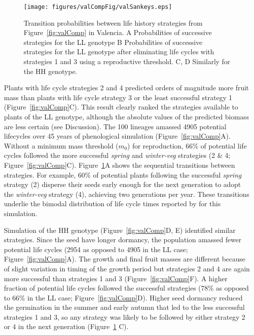 \begin{figure}[tb]
\texttt{[image: figures/valCompFig/valSankeys.eps]}
\caption{Transition probabilities between life history strategies from
  Figure~\ref{fig:valComp} in Valencia. A Probabilities of successive strategies
  for the LL genotype B Probabilities of successive strategies for the LL
  genotype after eliminating life cycles with strategies 1 and 3 using a
  reproductive threshold. C, D Similarly for the HH genotype.}
\label{fig:valSank}
\end{figure}

Plants with life cycle strategies 2 and 4 predicted orders of magnitude more
fruit mass than plants with life cycle strategy 3 or the least successful
strategy 1 (Figure~\ref{fig:valComp}C). This result clearly ranked the
strategies available to plants of the LL genotype, although the absolute values
of the predicted biomass are less certain (see Discussion). The 100 lineages
amassed 4905 potential lifecycles over 45 years of phenological simulation
(Figure~\ref{fig:valComp}A). Without a minimum mass threshold ($m_0$) for
reproduction, 66\% of potential life cycles followed the more successful
\emph{spring} and \emph{winter-veg} strategies (2 \& 4;
Figure~\ref{fig:valComp}C). Figure~\ref{fig:valSank}A shows the sequential
transitions between strategies. For example, 60\% of potential plants following
the successful \emph{spring} strategy (2) disperse their seeds early enough for
the next generation to adopt the \emph{winter-veg} strategy (4), achieving two
generations per year. These transitions underlie the bimodal distribution of
life cycle times reported by \citet{burghardt_modeling_2015} for this
simulation.

Simulation of the HH genotype (Figure~\ref{fig:valComp}D, E) identified similar
strategies. Since the seed have longer dormancy, the population amassed
fewer potential life cycles (2954 as opposed to 4905 in the LL case;
Figure~\ref{fig:valComp}A). The growth and final fruit masses are different because of
slight variation in timing of the growth period but strategies 2 and 4
are again more successful than strategies 1 and 3 (Figure~\ref{fig:valComp}F). A higher
fraction of potential life cycles followed the successful strategies
(78\% as opposed to 66\% in the LL case; Figure~\ref{fig:valComp}D). Higher seed
dormancy reduced the germination in the summer and early autumn that led
to the less successful strategies 1 and 3, so any strategy was likely to
be followed by either strategy 2 or 4 in the next generation
(Figure~\ref{fig:valSank} C).

